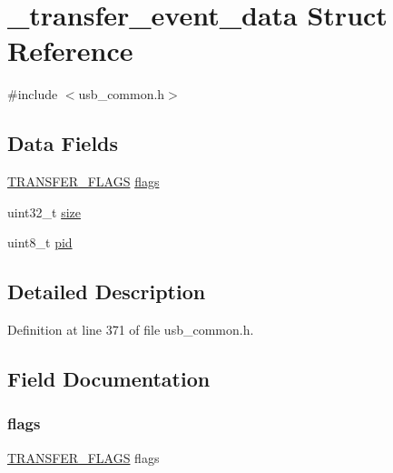 \hypertarget{struct__transfer__event__data}{}\section{\+\_\+transfer\+\_\+event\+\_\+data Struct Reference}
\label{struct__transfer__event__data}


{\ttfamily \#include $<$usb\+\_\+common.\+h$>$}

\subsection*{Data Fields}
\begin{DoxyCompactItemize}
\item 
\mbox{\hyperlink{union_t_r_a_n_s_f_e_r___f_l_a_g_s}{T\+R\+A\+N\+S\+F\+E\+R\+\_\+\+F\+L\+A\+GS}} \mbox{\hyperlink{struct__transfer__event__data_a0e968e27c96ea986123539dacc9c1175}{flags}}
\item 
uint32\+\_\+t \mbox{\hyperlink{struct__transfer__event__data_ab2c6b258f02add8fdf4cfc7c371dd772}{size}}
\item 
uint8\+\_\+t \mbox{\hyperlink{struct__transfer__event__data_a108af4844b813f4ea332bab4e84aa87e}{pid}}
\end{DoxyCompactItemize}


\subsection{Detailed Description}


Definition at line 371 of file usb\+\_\+common.\+h.



\subsection{Field Documentation}
\mbox{\label{struct__transfer__event__data_a0e968e27c96ea986123539dacc9c1175}} 
\subsubsection{\texorpdfstring{flags}{flags}}
{\footnotesize\ttfamily \mbox{\hyperlink{union_t_r_a_n_s_f_e_r___f_l_a_g_s}{T\+R\+A\+N\+S\+F\+E\+R\+\_\+\+F\+L\+A\+GS}} flags}



